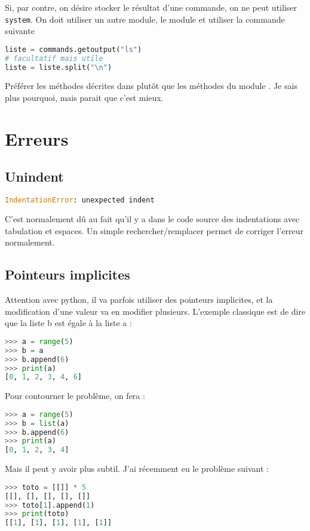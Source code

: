 \documentclass[a4paper,twoside]{article}
\begin{document}
Si, par contre, on désire stocker le résultat d'une commande, on ne peut utiliser \texttt{system}. On doit utiliser un autre module, le module  et utiliser la commande suivante
\begin{lstlisting}[language=python]
liste = commands.getoutput("ls")
# facultatif mais utile
liste = liste.split("\n")
\end{lstlisting}

\begin{attention}
Préférer les méthodes décrites dans  plutôt que les méthodes du module . Je sais plus pourquoi, mais parait que c'est mieux.
\end{attention}

\section{Erreurs}
\subsection{Unindent}
\begin{lstlisting}[language=python]
IndentationError: unexpected indent
\end{lstlisting}

C'est normalement dû au fait qu'il y a dans le code source des indentations avec tabulation et espaces. Un simple rechercher/remplacer permet de corriger l'erreur normalement.

\subsection{Pointeurs implicites}
Attention avec python, il va parfois utiliser des pointeurs implicites, et la modification d'une valeur va en modifier plusieurs. L'exemple classique est de dire que la liste b est égale à la liste a :
\begin{lstlisting}[language=python]
>>> a = range(5)
>>> b = a
>>> b.append(6)
>>> print(a)
[0, 1, 2, 3, 4, 6]
\end{lstlisting}

Pour contourner le problème, on fera :
\begin{lstlisting}[language=python]
>>> a = range(5)
>>> b = list(a)
>>> b.append(6)
>>> print(a)
[0, 1, 2, 3, 4]
\end{lstlisting}

\bigskip

Mais il peut y avoir plus subtil. J'ai récemment eu le problème suivant :
\begin{lstlisting}[language=python]
>>> toto = [[]] * 5
[[], [], [], [], []]
>>> toto[1].append(1)
>>> print(toto)
[[1], [1], [1], [1], [1]]
\end{lstlisting}
\end{document}
